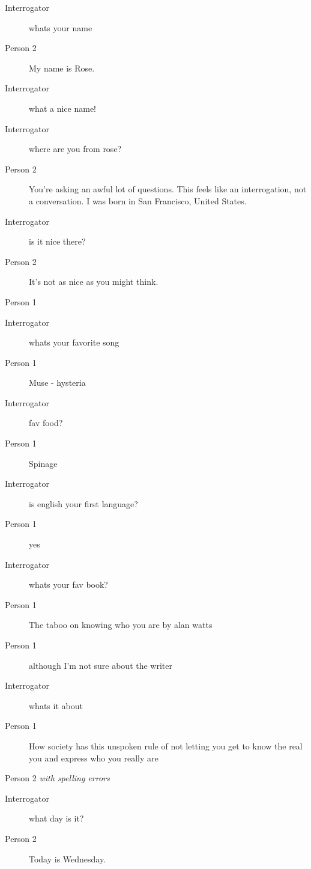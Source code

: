 \begin{itemize}
\begin{description}
\begin{description}
               \item [Interrogator] whats your name\
               \item [Person 2] My name is Rose.
               \item [Interrogator] what a nice name!
               \item [Interrogator] where are you from rose?
               \item [Person 2] You're asking an awful lot of questions. This feels like an interrogation, not a conversation. I was born in San Francisco, United States.
               \item [Interrogator] is it nice there?
               \item [Person 2] It's not as nice as you might think.
            \end{description}
         \item [Second conversation] Person 1
            \begin{description}
               \item [Interrogator] whats your favorite song
               \item [Person 1] Muse - hysteria
               \item [Interrogator] fav food?
               \item [Person 1] Spinage
               \item [Interrogator] is english your first language?
               \item [Person 1] yes
               \item [Interrogator] whats your fav book?\
               \item [Person 1] The taboo on knowing who you are by alan watts
               \item [Person 1] although I'm not sure about the writer
               \item [Interrogator] whats it about
               \item [Person 1] How society has this unspoken rule of not letting you get to know the real you and express who you really are
            \end{description}
         \item [Second conversation] Person 2 \textit{with spelling errors}
            \begin{description}
               \item [Interrogator] what day is it?
               \item [Person 2] Today is Wednesday.

\end{description}
\end{description}
\end{itemize}

